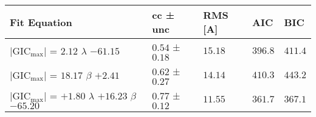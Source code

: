 \begin{tabular}{lllll}
\toprule
Fit Equation & cc ± unc & RMS [A] & AIC & BIC \\
\midrule
$\vert{\text{GIC}_\text{max}}\vert$ = $2.12$ $\lambda$ $-61.15$ & $0.54$ ± $0.18$ & $15.18$ & $396.8$ & $411.4$ \\
$\vert{\text{GIC}_\text{max}}\vert$ = $18.17$ $\beta$ $+2.41$ & $0.62$ ± $0.27$ & $14.14$ & $410.3$ & $443.2$ \\
$\vert{\text{GIC}_\text{max}}\vert$ = $+1.80$ $\lambda$ $+16.23$ $\beta$ $-65.20$ & $0.77$ ± $0.12$ & $11.55$ & $361.7$ & $367.1$ \\
\bottomrule
\end{tabular}
